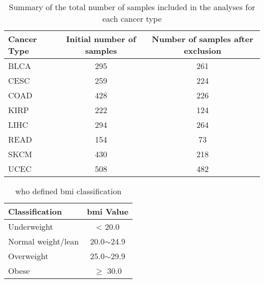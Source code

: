 \begin{table}[p]
	\caption{Summary of the total number of samples included in the analyses for each cancer type}
	\label{tab:samplesize}
	\begin{center}
		\begin{tabular}{lcc}
			Cancer Type   & Initial number of samples & Number of samples after exclusion\\
			\hline
			\hline
			\rule{0pt}{2.25ex}BLCA & 295 & 261   \\
			CESC                   & 259 & 224   \\
			COAD                   & 428 & 226   \\
			KIRP                   & 222 & 124   \\
			LIHC                   & 294 & 264   \\
			READ                   & 154 & 73    \\
			SKCM                   & 430 & 218   \\
			UCEC                   & 508 & 482   \\
			\hline
			\hline
		\end{tabular}
	\end{center}
\end{table}

\begin{table}[p]
	\caption{\gls{who} defined \gls{bmi} classification}
	\label{tab:whobmiclass}
	\begin{center}
		\begin{tabular}{lc}
			Classification & \gls{bmi} Value\\
			\hline
			\rule{0pt}{2.25ex}Underweight & \textless{} 20.0\\
			Normal weight/lean & 20.0$\sim$24.9\\
			Overweight & 25.0$\sim$29.9\\
			Obese & $\geq{}$ 30.0\\
			\hline
			\hline
		\end{tabular}
	\end{center}
\end{table}


